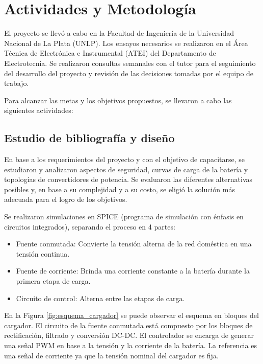 \section{Actividades y Metodología}


El proyecto se llevó a cabo en la Facultad de Ingeniería de la Universidad Nacional de La Plata (UNLP).
Los ensayos necesarios se realizaron en el Área Técnica de Electrónica e Instrumental (ATEI) del Departamento de Electrotecnia.
Se realizaron consultas semanales con el tutor para el seguimiento del desarrollo del proyecto y
revisión de las decisiones tomadas por el equipo de trabajo.

Para alcanzar las metas y los objetivos propuestos, se llevaron a cabo las siguientes actividades:

\subsection{Estudio de bibliografía y diseño} \label{subsection:estudio_bibliografia}

En base a los requerimientos del proyecto y con el objetivo de capacitarse, se estudiaron y analizaron aspectos de seguridad, 
curvas de carga de la batería y topologías de convertidores de potencia. 
Se evaluaron las diferentes alternativas posibles y, en base a su complejidad y a su costo,
se eligió la solución más adecuada para el logro de los objetivos. 

Se realizaron simulaciones en SPICE (programa de simulación con énfasis en circuitos integrados),
separando el proceso en 4 partes:
\begin{itemize}
    \item Fuente conmutada: Convierte la tensión alterna de la red doméstica en una tensión continua.
    \item Fuente de corriente: Brinda una corriente constante a la batería durante la primera etapa de carga.
    \item Circuito de control: Alterna entre las etapas de carga.
\end{itemize}

En la Figura \ref{fig:esquema_cargador} se puede observar el esquema en bloques del cargador.
El circuito de la fuente conmutada está compuesto por los bloques de rectificación, filtrado y conversión DC-DC.
El controlador se encarga de generar una señal PWM en base a la tensión y la corriente de la batería.
La referencia es una señal de corriente ya que la tensión nominal del cargador es fija.


